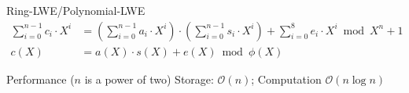 \documentclass[xcolor=table,10pt,aspectratio=169]{beamer}
\begin{document}
\begin{frame}[label={sec:org806ccb2}]{Ring-LWE/Polynomial-LWE}
\begin{align*}
\sum_{i=0}^{n-1} c_{i} \cdot X^{i} &= \left(\sum_{i=0}^{n-1} a_{i} \cdot X^{i}\right) \cdot \left(\sum_{i=0}^{n-1} s_{i} \cdot X^{i}\right) + \sum_{i=0}^{8} e_{i} \cdot X^{i} \bmod X^{n} +1\\
c(X) &= a(X) \cdot s(X) + e(X) \bmod \phi(X)
\end{align*}
\begin{block}{Performance (\(n\) is a power of two)}
Storage: \(\mathcal{O}(n)\); Computation \(\mathcal{O}(n \log n)\)
\end{block}
{\footnotesize {} \par}

{\footnotesize {} \par}
\end{frame}
\end{document}
